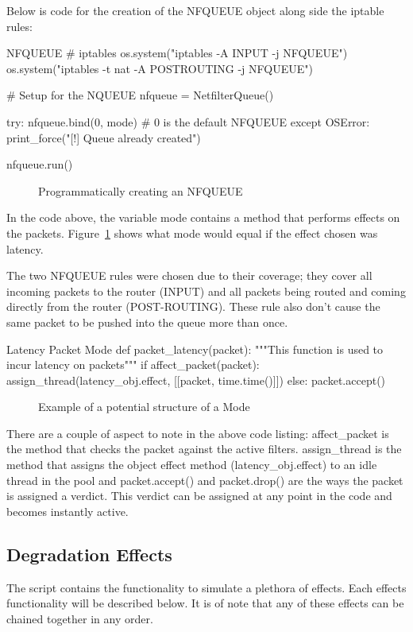 Below is code for the creation of the NFQUEUE object along side the iptable rules:
\begin{Code}[]{NFQUEUE}
# iptables
os.system("iptables -A INPUT -j NFQUEUE")
os.system("iptables -t nat -A POSTROUTING -j NFQUEUE")

# Setup for the NQUEUE
nfqueue = NetfilterQueue()

try:
	nfqueue.bind(0, mode)  # 0 is the default NFQUEUE
except OSError:
	print_force("[!] Queue already created")
	
nfqueue.run()
\end{Code}
\begin{figure}[h]
	\caption{Programmatically creating an NFQUEUE}
\end{figure}

In the code above, the variable {\code mode} contains a method that performs effects on the packets. Figure~\ref{ref:latencyMode} shows what {\code mode} would equal if the effect chosen was latency.

The two NFQUEUE rules were chosen due to their coverage; they cover all incoming packets to the router (INPUT) and all packets being routed and coming directly from the router (POST-ROUTING). These rule also don't cause the same packet to be pushed into the queue more than once.

\begin{Code}{Latency Packet Mode}
def packet_latency(packet):
    """This function is used to incur latency on packets"""
    if affect_packet(packet):
        assign_thread(latency_obj.effect, [[packet, time.time()]])
    else:
        packet.accept()
\end{Code}
\begin{figure}[h]
	\caption{Example of a potential structure of a {\code Mode}}
	\label{ref:latencyMode}
\end{figure}

There are a couple of aspect to note in the above code listing:
{\code affect\_packet} is the method that checks the packet against the active filters. 
{\code assign\_thread} is the method that assigns the object effect method ({\code latency\_obj.effect}) to an idle thread in the pool and {\code packet.accept()} and {\code packet.drop()} are the ways the packet is assigned a verdict. This verdict can be assigned at any point in the code and becomes instantly active.


\subsection{Degradation Effects}
The script contains the functionality to simulate a plethora of effects. Each effects functionality will be described below. It is of note that any of these effects can be chained together in any order.

